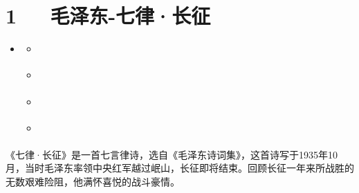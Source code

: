 \documentclass[letterpaper,12pt,english]{sphinxmanual}
\begin{document}
\chapter{1   毛泽东-七律·长征}
\label{\detokenize{p01_u6563_u6587/_u6bdb_u6cfd_u4e1c-_u4e03_u5f8b_xb7_u957f_u5f81:id1}}\label{\detokenize{p01_u6563_u6587/_u6bdb_u6cfd_u4e1c-_u4e03_u5f8b_xb7_u957f_u5f81::doc}}
\begin{sphinxShadowBox}
\begin{itemize}
\item {} 
\label{\detokenize{p01_u6563_u6587/_u6bdb_u6cfd_u4e1c-_u4e03_u5f8b_xb7_u957f_u5f81:id7}}{\hyperref[\detokenize{p01_u6563_u6587/_u6bdb_u6cfd_u4e1c-_u4e03_u5f8b_xb7_u957f_u5f81:id1}]{}}
\begin{itemize}
\item {} 
\label{\detokenize{p01_u6563_u6587/_u6bdb_u6cfd_u4e1c-_u4e03_u5f8b_xb7_u957f_u5f81:id8}}{\hyperref[\detokenize{p01_u6563_u6587/_u6bdb_u6cfd_u4e1c-_u4e03_u5f8b_xb7_u957f_u5f81:id3}]{}}

\item {} 
\label{\detokenize{p01_u6563_u6587/_u6bdb_u6cfd_u4e1c-_u4e03_u5f8b_xb7_u957f_u5f81:id9}}{\hyperref[\detokenize{p01_u6563_u6587/_u6bdb_u6cfd_u4e1c-_u4e03_u5f8b_xb7_u957f_u5f81:id4}]{}}

\item {} 
\label{\detokenize{p01_u6563_u6587/_u6bdb_u6cfd_u4e1c-_u4e03_u5f8b_xb7_u957f_u5f81:id10}}{\hyperref[\detokenize{p01_u6563_u6587/_u6bdb_u6cfd_u4e1c-_u4e03_u5f8b_xb7_u957f_u5f81:id5}]{}}

\item {} 
\label{\detokenize{p01_u6563_u6587/_u6bdb_u6cfd_u4e1c-_u4e03_u5f8b_xb7_u957f_u5f81:id11}}{\hyperref[\detokenize{p01_u6563_u6587/_u6bdb_u6cfd_u4e1c-_u4e03_u5f8b_xb7_u957f_u5f81:id6}]{}}

\end{itemize}

\end{itemize}
\end{sphinxShadowBox}

《七律·长征》是一首七言律诗，选自《毛泽东诗词集》，这首诗写于1935年10月，当时毛泽东率领中央红军越过岷山，长征即将结束。回顾长征一年来所战胜的无数艰难险阻，他满怀喜悦的战斗豪情。
\end{document}

